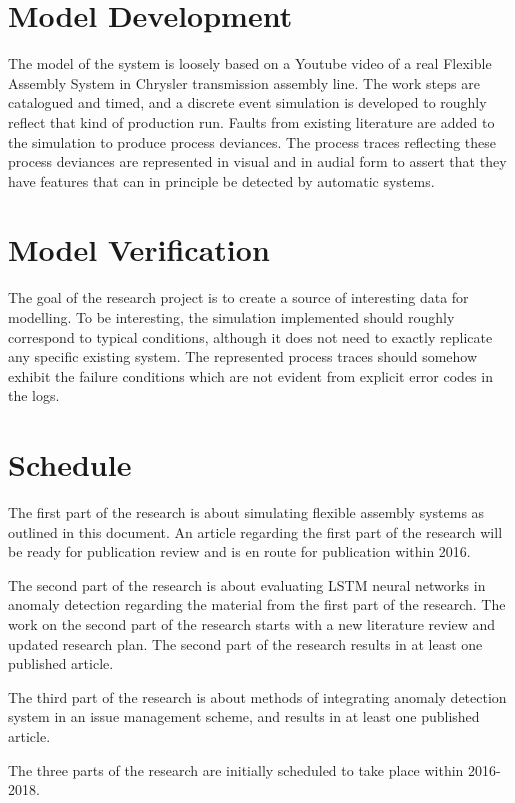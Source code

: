 \documentclass[a4paper,10pt]{article}
\begin{document}
\section{Model Development}

The model of the system is loosely based on a Youtube video\cite{transmission} of a real Flexible Assembly System in Chrysler transmission assembly line.
The work steps are catalogued and timed, and a discrete event simulation
is developed to roughly reflect that kind of production run. Faults from existing literature are added to the simulation to produce process deviances.
The process traces reflecting these process deviances are represented in visual and in audial form to assert that they have features that can in principle be detected
by automatic systems.

\section{Model Verification}

The goal of the research project is to create a source of interesting data for modelling. To be interesting, the simulation implemented should roughly correspond to typical
conditions, although it does not need to exactly replicate any specific existing system. The represented process traces should somehow exhibit the failure conditions
which are not evident from explicit error codes in the logs.

\section{Schedule}

The first part of the research is about simulating flexible assembly systems as outlined in this document.
An article regarding the first part of the research will be ready for publication review and is en route for publication within 2016.

The second part of the research is about evaluating LSTM neural networks in anomaly detection regarding the material from the first part of the research.
The work on the second part of the research starts with a new literature review and updated research plan. The second part of the research results in at least one published article.

The third part of the research is about methods of integrating anomaly detection system in an issue management scheme, and results in at least one published article.

The three parts of the research are initially scheduled to take place within 2016-2018.
\end{document}
